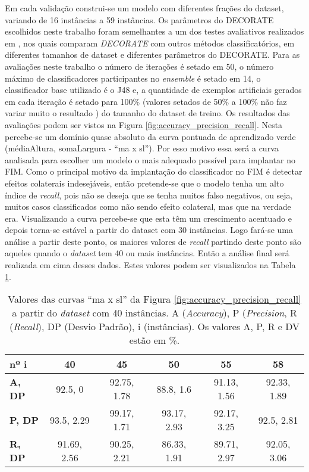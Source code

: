 Em cada validação construi-se um modelo com diferentes frações do dataset, variando de 16 instâncias a 59 instâncias. Os parâmetros do DECORATE escolhidos neste trabalho foram semelhantes a um dos testes avaliativos realizados em \cite{Melville:2004}, nos quais comparam \textit{DECORATE} com outros métodos classificatórios, em diferentes tamanhos de dataset e diferentes parâmetros do DECORATE. Para as avaliações neste trabalho o número de iterações é setado em 50, o número máximo de classificadores participantes no \textit{ensemble} é setado em 14, o classificador base utilizado é o J48 e, a quantidade de exemplos artificiais gerados em cada iteração é setado para 100\% (valores setados de 50\% a 100\% não faz variar muito o resultado \cite{Melville:2004}) do tamanho do dataset de treino. Os resultados das avaliações podem ser vistos na Figura \ref{fig:accuracy_precision_recall}. Nesta percebe-se um domínio quase absoluto da curva pontuada de aprendizado verde (médiaAltura, somaLargura - ``ma x sl''). Por esso motivo essa será a curva analisada para escolher um modelo o mais adequado possível para implantar no FIM. Como o principal motivo da implantação do classificador no FIM é detectar efeitos colaterais indesejáveis, então pretende-se que o modelo tenha um alto índice de \textit{recall}, pois não se deseja que se tenha muitos falso negativos, ou seja, muitos casos classificados como não sendo efeito colateral, mas que na verdade era. Visualizando a curva percebe-se que esta têm um crescimento acentuado e depois torna-se estável a partir do dataset com 30 instâncias. Logo fará-se uma análise a partir deste ponto, os maiores valores de \textit{recall} partindo deste ponto são aqueles quando o \textit{dataset} tem 40 ou mais instâncias. Então a análise final será realizada em cima desses dados. Estes valores podem ser visualizados na Tabela \ref{table:valorescurva}.

\begin{table}[!htp]
  \centering
  \begin{tabular}{ |l|c c c c c|}
    \hline
       {\bf nº i} & {\bf 40} & {\bf 45} & {\bf 50} & {\bf 55} & {\bf 58} \\
    \hline
       \textbf{A, DP} & 92.5, 0 & 92.75, 1.78 & 88.8, 1.6 & 91.13, 1.56 & 92.33, 1.89 \\
    \hline
       \textbf{P, DP} & 93.5, 2.29 & 99.17, 1.71 & 93.17, 2.93 &  92.17, 3.25 & 92.5, 2.81 \\
    \hline
       \textbf{R, DP} & 91.69, 2.56 & 90.25, 2.21 & 86.33, 1.91 & 89.71, 2.97 & 92.05, 3.06 \\
    \hline
  \end{tabular}
  \caption{Valores das curvas ``ma x sl'' da Figura \ref{fig:accuracy_precision_recall} a partir do \textit{dataset} com 40 instâncias. A (\textit{Accuracy}), P (\textit{Precision}, R (\textit{Recall}), DP (Desvio Padrão), i (instâncias). Os valores A, P, R e DV estão em \%.}
  \label{table:valorescurva}
\end{table}

